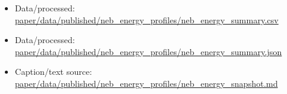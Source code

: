 \begin{itemize}[leftmargin=1.4em,noitemsep]
\item Data/processed: \begingroup\scriptsize\url{paper/data/published/neb_energy_profiles/neb_energy_summary.csv}\endgroup
\item Data/processed: \begingroup\scriptsize\url{paper/data/published/neb_energy_profiles/neb_energy_summary.json}\endgroup
\item Caption/text source: \begingroup\scriptsize\url{paper/data/published/neb_energy_profiles/neb_energy_snapshot.md}\endgroup
\end{itemize}
